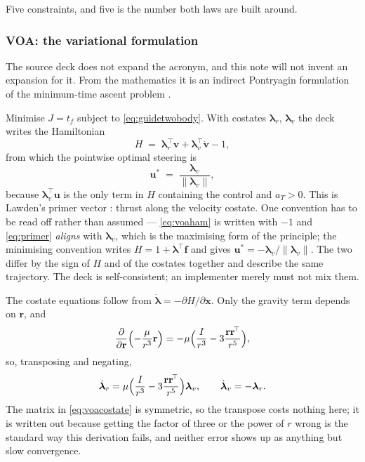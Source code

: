 \documentclass[11pt]{article}
\begin{document}
Five constraints, and five is the number both laws are built around.

\subsubsection{VOA: the variational formulation}
\label{sec:voa}

The source deck does not expand the acronym, and this note will not invent an
expansion for it. From the mathematics it is an indirect Pontryagin
formulation of the minimum-time ascent problem \cite{Pontryagin1962,Bryson1975}.

Minimise $J = t_f$ subject to \eqref{eq:guidetwobody}. With costates
$\boldsymbol{\lambda}_r$, $\boldsymbol{\lambda}_v$ the deck writes the
Hamiltonian
\begin{equation}
  H \;=\; \boldsymbol{\lambda}_r^{\!\top}\mathbf{v}
        + \boldsymbol{\lambda}_v^{\!\top}\dot{\mathbf{v}} - 1 ,
  \label{eq:voaham}
\end{equation}
from which the pointwise optimal steering is
\begin{equation}
  \mathbf{u}^{*} \;=\; \frac{\boldsymbol{\lambda}_v}
                            {\|\boldsymbol{\lambda}_v\|} ,
  \label{eq:primer}
\end{equation}
because $\boldsymbol{\lambda}_v^{\!\top}\mathbf{u}$ is the only term in $H$
containing the control and $a_T > 0$. This is Lawden's primer vector
\cite{Lawden1963}: thrust along the velocity costate. One convention has to be
read off rather than assumed --- \eqref{eq:voaham} is written with $-1$ and
\eqref{eq:primer} \emph{aligns} with $\boldsymbol{\lambda}_v$, which is the
maximising form of the principle; the minimising convention writes $H = 1 +
\boldsymbol{\lambda}^{\!\top}\mathbf{f}$ and gives $\mathbf{u}^{*} =
-\boldsymbol{\lambda}_v/\|\boldsymbol{\lambda}_v\|$. The two differ by the sign
of $H$ and of the costates together and describe the same trajectory. The deck
is self-consistent; an implementer merely must not mix them.

The costate equations follow from $\dot{\boldsymbol{\lambda}} = -\partial
H/\partial\mathbf{x}$. Only the gravity term depends on $\mathbf{r}$, and
\begin{equation}
  \frac{\partial}{\partial\mathbf{r}}\Bigl(-\frac{\mu}{r^3}\mathbf{r}\Bigr)
  = -\mu\Bigl(\frac{I}{r^3} - 3\frac{\mathbf{r}\mathbf{r}^{\!\top}}{r^5}\Bigr),
  \label{eq:gravgrad}
\end{equation}
so, transposing and negating,
\begin{equation}
  \dot{\boldsymbol{\lambda}}_r
    = \mu\Bigl(\frac{I}{r^3} - 3\frac{\mathbf{r}\mathbf{r}^{\!\top}}{r^5}\Bigr)
      \boldsymbol{\lambda}_v ,
  \qquad
  \dot{\boldsymbol{\lambda}}_v = -\boldsymbol{\lambda}_r .
  \label{eq:voacostate}
\end{equation}
The matrix in \eqref{eq:voacostate} is symmetric, so the transpose costs
nothing here; it is written out because getting the factor of three or the
power of $r$ wrong is the standard way this derivation fails, and neither error
shows up as anything but slow convergence.
\end{document}
